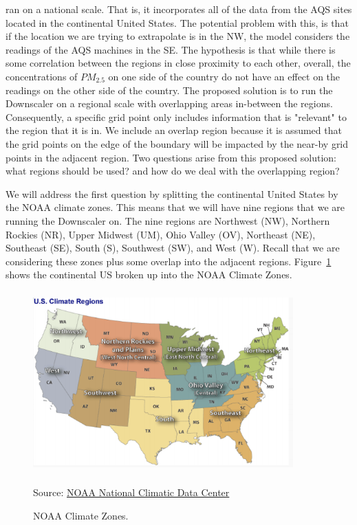\documentclass[10pt]{article}
\theoremstyle{plain}
\theoremstyle{definition}
\theoremstyle{remark}
\begin{document}
ran on a national scale.  That is, it incorporates all of the data from the AQS sites located in the continental United States.  The potential problem with this, is that if the location we are trying to extrapolate is in the NW, the model considers the readings of the AQS machines in the SE.  The hypothesis is that while there is some correlation between the regions in close proximity to each other, overall, the concentrations of $PM_{2.5}$ on one side of the country do not have an effect on the readings on the other side of the country.  The proposed solution is to run the Downscaler on a regional scale with overlapping areas in-between the regions.  Consequently, a specific grid point only includes information that is "relevant" to the region that it is in.  We include an overlap region because it is assumed that the grid points on the edge of the boundary will be impacted by the near-by grid points in the adjacent region.  Two questions arise from this proposed solution: what regions should be used? and how do we deal with the overlapping region?

\justify
We will address the first question by splitting the continental United States by the NOAA climate zones.  This means that we will have nine regions that we are running the Downscaler on.  The nine regions are Northwest (NW), Northern Rockies (NR), Upper Midwest (UM), Ohio Valley (OV), Northeast (NE), Southeast (SE), South (S), Southwest (SW), and West (W).  Recall that we are considering these zones plus some overlap into the adjacent regions. Figure~\ref{fig:US} shows the continental US broken up into the NOAA Climate Zones.

\begin{figure}
	\centering
	\vspace{-2em}
	\includegraphics[width= 10cm, scale = 1, height = 7cm]{ContUS}
	\caption{NOAA Climate Zones.}
	\begin{flushleft}
	Source: \href{https://www.epa.gov/sites/production/files/2016-05/us-climate-regions_0.gif}{NOAA National Climatic Data Center} 
	\end{flushleft}
	\label{fig:US}
\end{figure}
\end{document}
